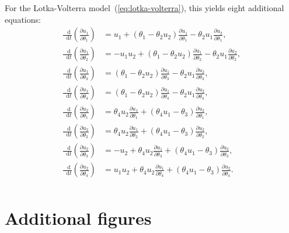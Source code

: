 \documentclass[11pt,a4paper]{report}
\newcommand*\diff{\mathop{}\!\mathrm{d}}
\begin{document}

For the Lotka-Volterra model~(\ref{eq:lotka-volterra}), this yields eight additional equations:
\begin{equation*}
\begin{aligned}
\frac{\diff}{\diff t}\left(\frac{\partial u_1}{\partial \theta_1}\right) &= u_1 + (\theta_1 - \theta_2 u_2) \frac{\partial u_1}{\partial \theta_1} - \theta_2 u_1 \frac{\partial u_2}{\partial \theta_1}, \\
\frac{\diff}{\diff t}\left(\frac{\partial u_1}{\partial \theta_2}\right) &= - u_1 u_2 + (\theta_1 - \theta_2 u_2) \frac{\partial u_1}{\partial \theta_2} - \theta_2 u_1 \frac{\partial u_2}{\partial \theta_2}, \\
\frac{\diff}{\diff t}\left(\frac{\partial u_1}{\partial \theta_3}\right) &= (\theta_1 - \theta_2 u_2) \frac{\partial u_1}{\partial \theta_3} - \theta_2 u_1 \frac{\partial u_2}{\partial \theta_3}, \\
\frac{\diff}{\diff t}\left(\frac{\partial u_1}{\partial \theta_4}\right) &= (\theta_1 - \theta_2 u_2) \frac{\partial u_1}{\partial \theta_4} - \theta_2 u_1 \frac{\partial u_2}{\partial \theta_4}, \\
\frac{\diff}{\diff t}\left(\frac{\partial u_2}{\partial \theta_1}\right) &= \theta_4 u_2 \frac{\partial u_1}{\partial \theta_1} + (\theta_4 u_1 - \theta_3) \frac{\partial u_2}{\partial \theta_1}, \\
\frac{\diff}{\diff t}\left(\frac{\partial u_2}{\partial \theta_2}\right) &= \theta_4 u_2 \frac{\partial u_1}{\partial \theta_2} + (\theta_4 u_1 - \theta_3) \frac{\partial u_2}{\partial \theta_2}, \\
\frac{\diff}{\diff t}\left(\frac{\partial u_2}{\partial \theta_3}\right) &= -u_2 + \theta_4 u_2 \frac{\partial u_1}{\partial \theta_3} + (\theta_4 u_1 - \theta_3) \frac{\partial u_2}{\partial \theta_3}, \\
\frac{\diff}{\diff t}\left(\frac{\partial u_2}{\partial \theta_4}\right) &= u_1 u_2 + \theta_4 u_2 \frac{\partial u_1}{\partial \theta_4} + (\theta_4 u_1 - \theta_3) \frac{\partial u_2}{\partial \theta_4}. \\
\end{aligned}
\end{equation*}

\chapter{Additional figures}
\label{appendix:figures}
\end{document}
